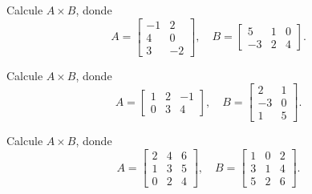 \begin{ejercicio}
Calcule $A \times B$, donde
\[
A=\begin{bmatrix} -1 & 2 \\ 4 & 0 \\ 3 & -2 \end{bmatrix}, \quad
B=\begin{bmatrix} 5 & 1 & 0 \\ -3 & 2 & 4 \end{bmatrix}.
\]
\end{ejercicio}
\muestraSolucion{
\[
AB=\begin{bmatrix} -11 & 3 & 8 \\ 20 & 4 & 0 \\ 21 & -1 & -8 \end{bmatrix}.
\]
}

\begin{ejercicio}
Calcule $A \times B$, donde
\[
A=\begin{bmatrix} 1 & 2 & -1 \\ 0 & 3 & 4 \end{bmatrix}, \quad
B=\begin{bmatrix} 2 & 1 \\ -3 & 0 \\ 1 & 5 \end{bmatrix}.
\]
\end{ejercicio}
\muestraSolucion{
\[
AB=\begin{bmatrix} -5 & -4 \\ -5 & 20 \end{bmatrix}.
\]
}

\begin{ejercicio}
Calcule $A \times B$, donde
\[
A=\begin{bmatrix} 2 & 4 & 6 \\ 1 & 3 & 5 \\ 0 & 2 & 4 \end{bmatrix}, \quad
B=\begin{bmatrix} 1 & 0 & 2 \\ 3 & 1 & 4 \\ 5 & 2 & 6 \end{bmatrix}.
\]
\end{ejercicio}
\muestraSolucion{
\[
AB=\begin{bmatrix} 44 & 16 & 56 \\ 35 & 13 & 44 \\ 26 & 10 & 32 \end{bmatrix}.
\]
}

